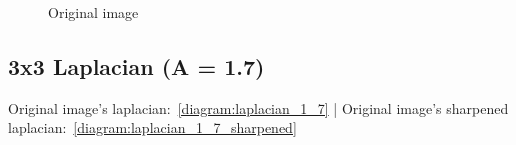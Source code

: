 \begin{figure}[!htb]
\begin{minipage}{0.40\textwidth}
        \caption{Original image}
        \end{minipage}
    \end{figure}


    \subsection{3x3 Laplacian (A = 1.7)}

    Original image's laplacian:~\ref{diagram:laplacian_1_7} |
    Original image's sharpened laplacian:~\ref{diagram:laplacian_1_7_sharpened}

